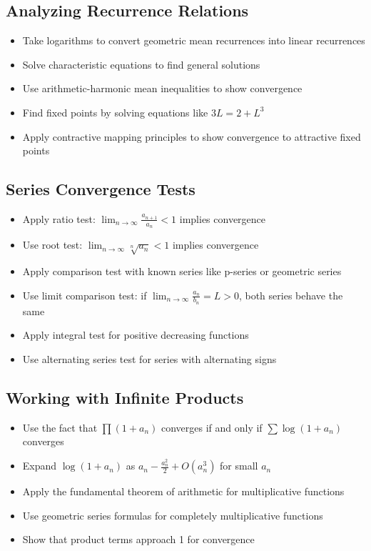 \subsection*{Analyzing Recurrence Relations}
\begin{itemize}
\item Take logarithms to convert geometric mean recurrences into linear recurrences
\item Solve characteristic equations to find general solutions
\item Use arithmetic-harmonic mean inequalities to show convergence
\item Find fixed points by solving equations like $3L = 2 + L^3$
\item Apply contractive mapping principles to show convergence to attractive fixed points
\end{itemize}

\subsection*{Series Convergence Tests}
\begin{itemize}
\item Apply ratio test: $\lim_{n\to\infty} \frac{a_{n+1}}{a_n} < 1$ implies convergence
\item Use root test: $\lim_{n\to\infty} \sqrt[n]{a_n} < 1$ implies convergence
\item Apply comparison test with known series like p-series or geometric series
\item Use limit comparison test: if $\lim_{n\to\infty} \frac{a_n}{b_n} = L > 0$, both series behave the same
\item Apply integral test for positive decreasing functions
\item Use alternating series test for series with alternating signs
\end{itemize}

\subsection*{Working with Infinite Products}
\begin{itemize}
\item Use the fact that $\prod(1+a_n)$ converges if and only if $\sum \log(1+a_n)$ converges
\item Expand $\log(1+a_n)$ as $a_n - \frac{a_n^2}{2} + O(a_n^3)$ for small $a_n$
\item Apply the fundamental theorem of arithmetic for multiplicative functions
\item Use geometric series formulas for completely multiplicative functions
\item Show that product terms approach 1 for convergence
\end{itemize}

